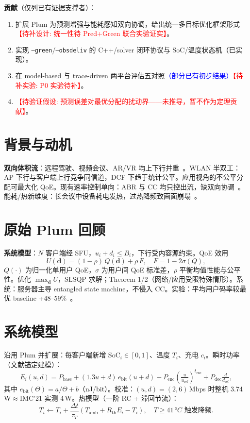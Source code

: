 \documentclass[journal,10pt]{IEEEtran}
\newcommand{\todoexp}[1]{\textcolor{red}{【待补实验: #1】}}
\newcommand{\tododesign}[1]{\textcolor{red}{【待补设计: #1】}}
\newcommand{\todothy}[1]{\textcolor{red}{【待验证假设: #1】}}
\newcommand{\prelim}[1]{\textcolor{blue}{#1}}
\begin{document}
\noindent\textbf{贡献}（仅列已有证据支撑者）：
\begin{enumerate}
  \item 扩展 Plum 为预测增强与能耗感知双向协调，给出统一多目标优化框架形式\tododesign{统一性待 Pred+Green 联合实验证实}。
  \item 实现 \texttt{--green}/\texttt{--obsdeliv} 的 C++/solver 闭环协议与 SoC/温度状态机（已实现）。
  \item 在 model-based 与 trace-driven 两平台评估五对照\prelim{（部分已有初步结果）}\todoexp{P0 实验待补}。
  \item \todothy{预测误差对最优分配的扰动界——未推导，暂不作为定理贡献}。
\end{enumerate}

\section{背景与动机}
\textbf{双向体积流}：远程驾驶、视频会议、AR/VR 均上下行并重~\cite{ton0580}。WLAN 半双工：AP 下行与客户端上行竞争同信道，DCF 下趋于统计公平。应用视角的不公平分配可最大化 QoE。现有速率控制单向：ABR 与 CC 均只控出流，缺双向协调~\cite{ton0066,ton0191,ton0450}。能耗/热新维度：长会议中设备耗电发热，过热降频致画面崩塌~\cite{ton0205,ton0534}。

\section{原始 Plum 回顾}
\textbf{系统模型}：$N$ 客户端经 SFU，$u_i+d_i\le B_i$，下行受内容源约束。QoE 效用
\begin{equation}
U(\mathbf d)=(1-\rho)\,Q(\mathbf d)+\rho\,F,\quad F=1-2\sigma(Q),
\end{equation}
$Q(\cdot)$ 为归一化单用户 QoE，$\sigma$ 为用户间 QoE 标准差，$\rho$ 平衡均值性能与公平性。优化 $\max_{\mathbf d} U$，SLSQP 求解；Theorem 1/2（网络/应用受限特殊情形）。系统：服务器主导 entangled state machine，不侵入 CC。实验：平均用户码率较最优 baseline +48--59\%~\cite{plum2024}。

\section{系统模型}
沿用 Plum 并扩展：每客户端新增 $\mathrm{SoC}_i\in[0,1]$、温度 $T_i$、充电 $c_i$。瞬时功率（文献锚定建模）：
\begin{equation}
E_i(u,d)=P_{\text{base}}+(1.3u+d)\,e_{\text{bit}}(u+d)+P_{\text{enc}}\!\left(\tfrac{u}{u_{\text{ref}}}\right)^{t_{\text{enc}}}+P_{\text{dec}}\tfrac{d}{d_{\text{ref}}},
\end{equation}
其中 $e_{\text{bit}}(\Theta)=a/\Theta+b$（nJ/bit）。校准：$(u,d)=(2,6)$\,Mbps 时整机 3.74\,W$\approx$IMC'21 实测 4\,W。热模型（一阶 RC + 滞回节流）：
\begin{equation}
T_i\leftarrow T_i+\frac{\Delta t}{\tau_T}(T_{\text{amb}}+R_{\text{th}}E_i-T_i),\quad T\ge 41\,°C\text{ 触发降频}.
\end{equation}
\end{document}
